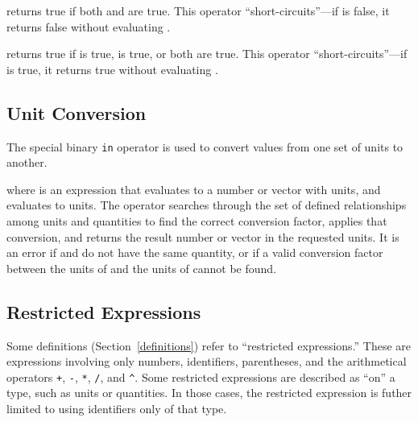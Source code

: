 \begin{syntax}
  
\end{syntax}
returns true if both  and  are true.  This operator
``short-circuits''---if  is false, it returns false without
evaluating .

\begin{syntax}
  
\end{syntax}
returns true if  is true,  is true, or both are true.
This operator ``short-circuits''---if  is true, it returns
true without evaluating .



\subsection{Unit Conversion}
\label{in-op}

The special binary \verb|in| operator is used to convert values from
one set of units to another.  

\begin{syntax}
  
\end{syntax}
where  is an expression that evaluates to a number or vector
with units, and  evaluates to units.  The  operator
searches through the set of defined relationships among units and
quantities to find the correct conversion factor, applies that
conversion, and returns the result number or vector in the requested
units.  It is an error if  and  do not have the same
quantity, or if a valid conversion factor between the units of
 and the units of  cannot be found.




\subsection{Restricted Expressions}
\label{restricted-expressions}

Some definitions (Section~\ref{definitions}) refer to ``restricted
expressions.''  These are expressions involving only numbers,
identifiers, parentheses, and the arithmetical operators \verb|+|,
\verb|-|, \verb|*|, \verb|/|, and \verb|^|.  Some restricted
expressions are described as ``on'' a type, such as units or
quantities.  In those cases, the restricted expression is futher
limited to using identifiers only of that type.



